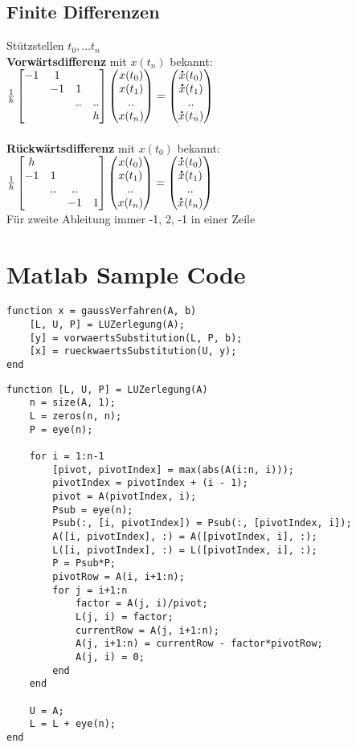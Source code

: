 \documentclass[german]{latex4ei/latex4ei_sheet}
\begin{document}
\begin{sectionbox}
\subsection{Finite Differenzen}
Stützstellen $t_0, \ldots t_n$\\
\textbf{Vorwärtsdifferenz} mit $x(t_n)$ bekannt:\\
$\frac{1}{h} \mat{ -1 & 1 & & \\ & -1 & 1 & \\ & & .. & .. \\ & & & h } \vect{ x(t_0) \\ x(t_1) \\ .. \\ x(t_n)} = \vect{ \dot x(t_0) \\ \dot x(t_1) \\ .. \\ \dot x(t_n)}$\\
\\
\textbf{Rückwärtsdifferenz} mit $x(t_0)$ bekannt:\\
$\frac{1}{h} \mat{ h & & & \\ -1 & 1 & & \\ & .. & .. & \\ & & -1 & 1 } \vect{ x(t_0) \\ x(t_1) \\ .. \\ x(t_n)} = \vect{ \dot x(t_0) \\ \dot x(t_1) \\ .. \\ \dot x(t_n)}$\\
Für zweite Ableitung immer -1, 2, -1 in einer Zeile\\
\end{sectionbox}

\section{Matlab Sample Code}
\begin{lstlisting}
function x = gaussVerfahren(A, b)
    [L, U, P] = LUZerlegung(A);
    [y] = vorwaertsSubstitution(L, P, b);
    [x] = rueckwaertsSubstitution(U, y);
end
\end{lstlisting}

\begin{lstlisting}
function [L, U, P] = LUZerlegung(A)
    n = size(A, 1);
    L = zeros(n, n);
    P = eye(n);

    for i = 1:n-1
        [pivot, pivotIndex] = max(abs(A(i:n, i)));
        pivotIndex = pivotIndex + (i - 1);
        pivot = A(pivotIndex, i);
        Psub = eye(n);
        Psub(:, [i, pivotIndex]) = Psub(:, [pivotIndex, i]);
        A([i, pivotIndex], :) = A([pivotIndex, i], :);
        L([i, pivotIndex], :) = L([pivotIndex, i], :);
        P = Psub*P;
        pivotRow = A(i, i+1:n);
        for j = i+1:n
            factor = A(j, i)/pivot;
            L(j, i) = factor;
            currentRow = A(j, i+1:n);
            A(j, i+1:n) = currentRow - factor*pivotRow;
            A(j, i) = 0;
        end
    end

    U = A;
    L = L + eye(n);
end
\end{lstlisting}
\end{document}
